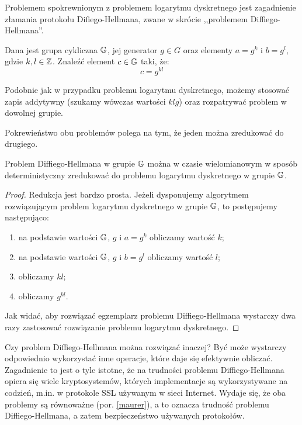 Problemem spokrewnionym z problemem logarytmu dyskretnego
jest zagadnienie złamania protokołu Difiego-Hellmana,
zwane w skrócie ,,problemem Diffiego-Hellmana''.

\begin{problem}
Dana jest grupa cykliczna $\mathbb{G}$,
jej generator $g \in G$
oraz elementy $a = g^k$ i $b = g^l$,
gdzie $k, l \in \mathbb{Z}$.
Znaleźć element $c \in \mathbb{G}$ taki, że:
\begin{equation}
c = g^{kl}
\end{equation}
\end{problem}

\begin{remark}
Podobnie jak w przypadku problemu logarytmu dyskretnego,
możemy stosować zapis addytywny (szukamy wówczas wartości $klg$)
oraz rozpatrywać problem w dowolnej grupie.
\end{remark}

Pokrewieństwo obu problemów polega na tym,
że jeden można zredukować do drugiego.

\begin{theorem}
Problem Diffiego-Hellmana w grupie $\mathbb{G}$ można
w czasie wielomianowym w sposób deterministyczny
zredukować do problemu logarytmu dyskretnego w grupie $\mathbb{G}$.
\end{theorem}

\begin{proof}
Redukcja jest bardzo prosta.
Jeżeli dysponujemy algorytmem rozwiązującym
problem logarytmu dyskretnego w grupie $\mathbb{G}$,
to postępujemy następująco:
\begin{enumerate}
\item na podstawie wartości $\mathbb{G}$, $g$ i $a = g^k$ obliczamy wartość $k$;
\item na podstawie wartości $\mathbb{G}$, $g$ i $b = g^l$ obliczamy wartość $l$;
\item obliczamy $kl$;
\item obliczamy $g^{kl}$.
\end{enumerate}
Jak widać, aby rozwiązać egzemplarz problemu Diffiego-Hellmana
wystarczy dwa razy zastosować rozwiązanie problemu logarytmu dyskretnego.
\end{proof}

Czy problem Diffiego-Hellmana można rozwiązać inaczej?
Być może wystarczy odpowiednio wykorzystać inne operacje,
które daje się efektywnie obliczać.
Zagadnienie to jest o tyle istotne,
że na trudności problemu Diffiego-Hellmana
opiera się wiele kryptosystemów,
których implementacje są wykorzystywane na codzień,
m.in. w protokole SSL używanym w sieci Internet.
Wydaje się, że oba problemy są równoważne (por. \ref{maurer}),
a to oznacza trudność problemu Diffiego-Hellmana,
a zatem bezpieczeństwo używanych protokołów.


